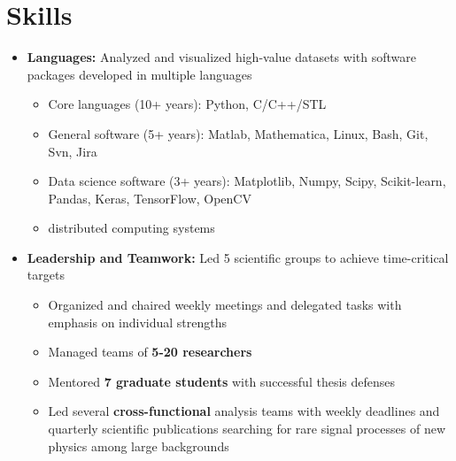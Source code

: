 \documentclass{myfancycv}
\begin{document}
\section{Skills}
\begin{itemize}

\item {\textbf{Languages:} Analyzed and visualized high-value datasets with software packages developed in multiple languages
{\begin{itemize}\setlength\itemindent{-2.2em}
\item Core languages (10+ years): Python, C/C++/STL
\item General software (5+ years): Matlab, Mathematica, Linux, Bash, Git, Svn, Jira
\item Data science software (3+ years): Matplotlib, Numpy, Scipy, Scikit-learn, Pandas, Keras, TensorFlow, OpenCV
\item  distributed computing systems
\end{itemize}
}
}

\vspace{6pt}

\item {\textbf{Leadership and Teamwork:} Led 5 scientific groups to achieve time-critical targets
{\begin{itemize}\setlength\itemindent{-2.2em}
    \item Organized and chaired weekly meetings and delegated tasks with emphasis on individual strengths
    \item Managed teams of {\bf5-20 researchers} %
    \item Mentored {\bf 7 graduate students} with successful thesis defenses
    \item Led several {\bf cross-functional} analysis teams with weekly deadlines and quarterly scientific publications searching for rare signal processes of new physics among large backgrounds


\end{itemize}}%
}

\vspace{6pt}


\end{itemize}
\end{document}
